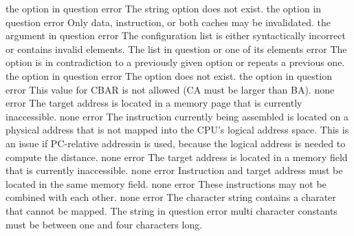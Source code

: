\documentclass[12pt,twoside]{report}
\begin{document}
\begin{description}
               {the option in question}
               {error}
               {The string option does not exist.}
               {the option in question}
               {error}
               {Only data, instruction, or both caches may be invalidated.}
               {the argument in question}
               {error}
               {The configuration list is either syntactically incorrect or
                contains invalid elements.}
               {The list in question or one of its elements}
               {error}
               {The option is in contradiction to a previously given option or repeats a previous one.}
               {the option in question}
               {error}
               {The option does not exist.}
               {the option in question}
               {error}
               {This value for CBAR is not allowed (CA must be larger than BA).}
               {none}
               {error}
               {The target address is located in a memory page that is currently
                inaccessible.}
               {none}
               {error}
               {The instruction currently being assembled is located on a physical
                address that is not mapped into the CPU's logical address space.
                This is an issue if PC-relative addressin is used, because the
                logical address is needed to compute the distance.}
               {none}
               {error}
               {The target address is located in a memory field that is currently
                inaccessible.}
               {none}
               {error}
               {Instruction and target address must be located in the
                same memory field.}
               {none}
               {error}
               {These instructions may not be combined with each other.}
               {none}
               {error}
               {The character string contains a charater that cannot be mapped.}
               {The string in question}
               {error}
               {multi character constants must be between one and four characters long.}

\end{description}
\end{document}
